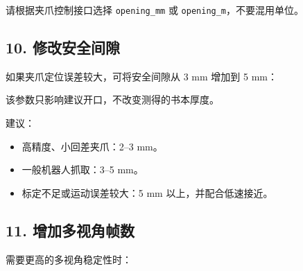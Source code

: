 \documentclass[
  chinese,
  11pt,
  a4paper,
]{article}
\newenvironment{Shaded}{\begin{snugshade}}{\end{snugshade}}
\newcommand{\AttributeTok}[1]{\textcolor[rgb]{0.13,0.29,0.53}{#1}}
\newcommand{\DataTypeTok}[1]{\textcolor[rgb]{0.13,0.29,0.53}{#1}}
\newcommand{\NormalTok}[1]{#1}
\newcommand{\OperatorTok}[1]{\textcolor[rgb]{0.81,0.36,0.00}{\textbf{#1}}}
\newcommand{\StringTok}[1]{\textcolor[rgb]{0.31,0.60,0.02}{#1}}
\newcommand{\VariableTok}[1]{\textcolor[rgb]{0.00,0.00,0.00}{#1}}
\providecommand{\tightlist}{%
  \setlength{\itemsep}{0pt}\setlength{\parskip}{0pt}}
\begin{document}
请根据夹爪控制接口选择 \texttt{opening\_mm} 或
\texttt{opening\_m}，不要混用单位。

\subsection{10.
修改安全间隙}\label{10-ux4feeux6539ux5b89ux5168ux95f4ux9699}

如果夹爪定位误差较大，可将安全间隙从 3 mm 增加到 5 mm：

\begin{Shaded}
\end{Shaded}

该参数只影响建议开口，不改变测得的书本厚度。

建议：

\begin{itemize}
\tightlist
\item
  高精度、小回差夹爪：2--3 mm。
\item
  一般机器人抓取：3--5 mm。
\item
  标定不足或运动误差较大：5 mm 以上，并配合低速接近。
\end{itemize}

\subsection{11.
增加多视角帧数}\label{11-ux589eux52a0ux591aux89c6ux89d2ux5e27ux6570}

需要更高的多视角稳定性时：

\begin{Shaded}
\end{Shaded}
\end{document}
